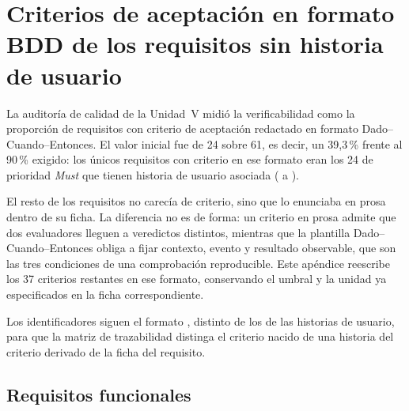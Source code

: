 
\section{Criterios de aceptación en formato BDD de los requisitos sin historia de usuario}
\label{ap:bdd}

La auditoría de calidad de la Unidad~V midió la verificabilidad como la proporción de requisitos con
criterio de aceptación redactado en formato Dado--Cuando--Entonces. El valor inicial fue de
24 sobre 61, es decir, un 39,3\,\% frente al 90\,\% exigido: los únicos requisitos con criterio en
ese formato eran los 24 de prioridad \emph{Must} que tienen historia de usuario asociada
( a ).

El resto de los requisitos no carecía de criterio, sino que lo enunciaba en prosa dentro de su ficha.
La diferencia no es de forma: un criterio en prosa admite que dos evaluadores lleguen a veredictos
distintos, mientras que la plantilla Dado--Cuando--Entonces obliga a fijar contexto, evento y
resultado observable, que son las tres condiciones de una comprobación reproducible. Este apéndice
reescribe los 37 criterios restantes en ese formato, conservando el umbral y la unidad ya
especificados en la ficha correspondiente.

Los identificadores siguen el formato , distinto de los  de las historias de
usuario, para que la matriz de trazabilidad distinga el criterio nacido de una historia del criterio
derivado de la ficha del requisito.

\subsection*{Requisitos funcionales}

